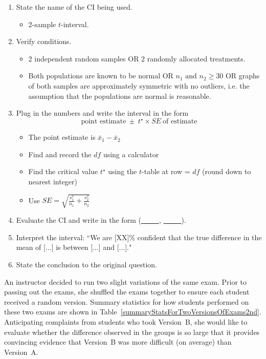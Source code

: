 \begin{termBox}{
\begin{enumerate}
\setlength{\itemsep}{0mm}
\item State the name of the CI being used.\vspace{-1.5mm}
\begin{itemize}
\setlength{\itemsep}{0mm}
\item 2-sample $t$-interval.
\end{itemize}
\item Verify conditions.\vspace{-1.5mm}
\begin{itemize}
\item 2 independent random samples OR 2 randomly allocated treatments.
\item Both populations are known to be normal OR $n_1 \text{ and } n_2\ge 30$ OR graphs of both samples are approximately symmetric with no outliers, i.e. the assumption that the populations are normal is reasonable.
\end{itemize}
\item Plug in the numbers and write the interval in the form
$$\text{point estimate}\ \pm\ t^{\star} \times SE\ \text{of estimate}$$
\begin{itemize}
\setlength{\itemsep}{0mm}
\item The point estimate is $\bar{x}_1-\bar{x}_2$
\item Find and record the $df$ using a calculator
\item Find the critical value $t^{\star}$ using the $t$-table at row = $df$ (round down to nearest integer)
\item Use $SE = \sqrt{\frac{s^2_1}{n_1}+\frac{s^2_2}{n_2}}$
\end{itemize}
\item Evaluate the CI and write in the form (\underline{\ \ \ \ \ }, \underline{\ \ \ \ \ }).
\item Interpret the interval:  ``We are [XX]\% confident that the true difference in the mean of [...] is between [...] and [...]."
\item State the conclusion to the original question.
\end{enumerate}}
\end{termBox}


An instructor decided to run two slight variations of the same exam. Prior to passing out the exams, she shuffled the exams together to ensure each student received a random version. Summary statistics for how students performed on these two exams are shown in Table~\ref{summaryStatsForTwoVersionsOfExams2nd}. Anticipating complaints from students who took Version~B, she would like to evaluate whether the difference observed in the groups is so large that it provides convincing evidence that Version~B was more difficult (on average) than Version~A.

